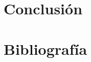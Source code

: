 \documentclass[a4paper]{article}
\numberwithin{equation}{section}
\begin{document}
\newpage










\section{Conclusión}



\newpage

\section{Bibliografía}



\end{document}
